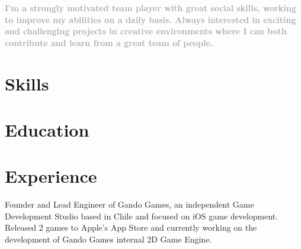 \documentclass[10pt, a4paper, dvips]{moderncv}
\begin{document}
\maketitle

\begin{small}
\textcolor{darkgray}{
\textbf{I'm a strongly motivated team player with great social skills, working to improve my abilities on a daily basis. Always interested in exciting and challenging projects in creative environments where I can
both contribute and learn from a great team of people.}}
\end{small}

\section{Skills}


\section{Education}

\section{Experience}

{
\begin{scriptsize}
Founder and Lead Engineer of Gando Games, an independent Game Development Studio based in Chile and focused on iOS game development. Released 2 games to Apple's App Store and currently working on the development of Gando Games internal 2D Game Engine.\\
\end{scriptsize}
}
\end{document}
